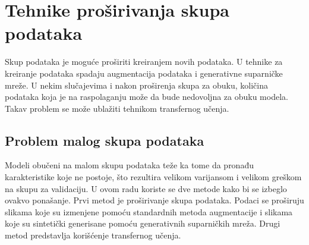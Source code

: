 \documentclass[12pt,oneside]{memoir}
\begin{document}
\chapter{Tehnike proširivanja skupa podataka}
\label{section3}

Skup podataka je moguće proširiti kreiranjem novih podataka. U tehnike za kreiranje podataka spadaju augmentacija podataka i generativne suparničke mreže. U nekim slučajevima i nakon proširenja skupa za obuku, količina podataka koja je na raspolaganju može da bude nedovoljna za obuku modela. Takav problem se može ublažiti tehnikom transfernog učenja. 

\section{Problem malog skupa podataka}




Modeli obučeni na malom skupu podataka teže ka tome da pronađu karakteristike koje ne postoje, što rezultira velikom varijansom i velikom greškom na skupu za validaciju. U ovom radu koriste se dve metode kako bi se izbeglo ovakvo ponašanje. Prvi metod je proširivanje skupa podataka. Podaci se proširuju slikama koje su izmenjene pomoću standardnih metoda augmentacije i slikama koje su sintetički generisane pomoću generativnih suparničkih mreža. Drugi metod predstavlja korišćenje transfernog učenja.

\end{document}

